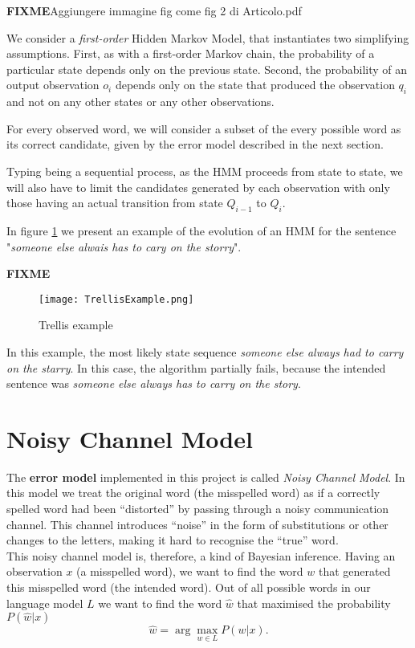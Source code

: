 \textbf{FIXME}{Aggiungere immagine fig come fig 2 di Articolo.pdf }

We consider a \textit{first-order} Hidden Markov Model, that instantiates two simplifying assumptions. First, as 
with a first-order Markov chain, the probability of a particular state depends only on the previous state. Second, 
the probability of an output observation $o_i$ depends only on the state that produced the observation $q_i$ 
and not on any other states or any other observations.

For every observed word, we will consider a subset of the every possible word as its correct candidate, given by 
the error model described in the next section.

Typing being a sequential process, as the HMM proceeds from state to state, we will also have to limit the 
candidates generated by each observation with only those having an actual transition from state $Q_{i-1}$ to 
$Q_i$.

In figure \ref{fig:trellis} we present an example of the evolution of an HMM for the sentence "\textsl{someone 
else alwais has to cary on the storry}".

\textbf{FIXME}
\begin{figure}[H]
	\centering
	\texttt{[image: TrellisExample.png]}
	\caption{Trellis example}
	\label{fig:trellis}
\end{figure}

In this example, the most likely state sequence \textsl{someone else always had to carry on the starry}. In this 
case, the algorithm partially fails, because the intended sentence was \textsl{someone else always has to carry 
on the story}.

\section{Noisy Channel Model}
The \textbf{error model} implemented in this project is called \textit{Noisy Channel Model}.
In this model we treat the original word (the misspelled word) as if a correctly spelled word had been “distorted” 
by passing through  a noisy communication channel. This channel introduces “noise” in the form of 
substitutions or other changes to the letters, making it hard to recognise the “true” word. \\

This noisy channel model is, therefore, a kind of Bayesian inference.
Having an observation $x$ (a misspelled word), we want to find the word $w$ that generated this misspelled word (the intended word).
Out of all possible words in our language model $L$ we want to find the word $\hat{w}$ that maximised the probability $P(\hat{w}|x)$ 
\begin{equation}\label{eq:4.1}
	\hat{w} = \arg\max_{w \in L} P(w|x) \mbox{.}
\end{equation}


